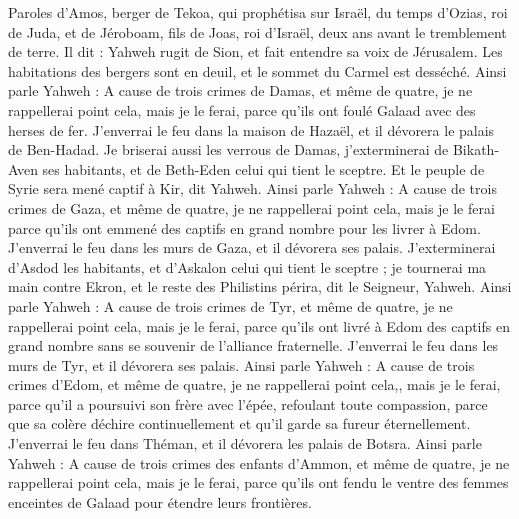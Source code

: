 \begin{multicols}{2}
\VerseOne{}Paroles d'Amos, berger de Tekoa, qui prophétisa sur Israël, du temps d’Ozias, roi de Juda, et de Jéroboam, fils de Joas, roi d'Israël, deux ans avant le tremblement de terre.
Il dit : Yahweh rugit de Sion, et fait entendre sa voix de Jérusalem. Les habitations des bergers sont en deuil, et le sommet du Carmel est desséché.
Ainsi parle Yahweh : A cause de trois crimes de Damas, et même de quatre, je ne rappellerai point cela, mais je le ferai, parce qu'ils ont foulé Galaad avec des herses de fer.
J'enverrai le feu dans la maison de Hazaël, et il dévorera le palais de Ben-Hadad.
Je briserai aussi les verrous de Damas, j'exterminerai de Bikath-Aven ses habitants, et de Beth-Eden celui qui tient le sceptre. Et le peuple de Syrie sera mené captif à Kir, dit Yahweh.
Ainsi parle Yahweh : A cause de trois crimes de Gaza, et même de quatre, je ne rappellerai point cela, mais je le ferai parce qu'ils ont emmené des captifs en grand nombre pour les livrer à Edom.
J'enverrai le feu dans les murs de Gaza, et il dévorera ses palais.
J'exterminerai d'Asdod les habitants, et d'Askalon celui qui tient le sceptre ; je tournerai ma main contre Ekron, et le reste des Philistins périra, dit le Seigneur, Yahweh.
Ainsi parle Yahweh : A cause de trois crimes de Tyr, et même de quatre, je ne rappellerai point cela, mais je le ferai, parce qu'ils ont livré à Edom des captifs en grand nombre sans se souvenir de l'alliance fraternelle.
J'enverrai le feu dans les murs de Tyr, et il dévorera ses palais.
Ainsi parle Yahweh : A cause de trois crimes d'Edom, et même de quatre, je ne rappellerai point cela,, mais je le ferai, parce qu'il a poursuivi son frère avec l'épée, refoulant toute compassion, parce que sa colère déchire continuellement et qu'il garde sa fureur éternellement.
J'enverrai le feu dans Théman, et il dévorera les palais de Botsra.
Ainsi parle Yahweh : A cause de trois crimes des enfants d'Ammon, et même de quatre, je ne rappellerai point cela, mais je le ferai, parce qu’ils ont fendu le ventre des femmes enceintes de Galaad pour étendre leurs frontières.

\end{multicols}

